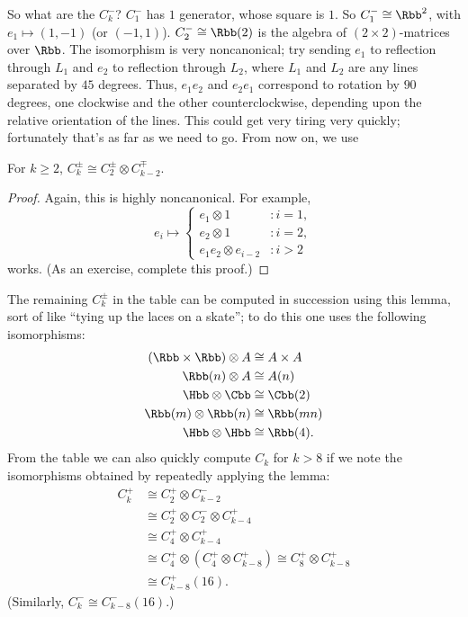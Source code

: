 So what are the $C_k^-$?  $C_1^-$ has $1$ generator, whose square is $1$.  So $C_1^- \cong \Rbb^2$, with $e_1 \mapsto (1, -1)$ (or $(-1, 1)$).  $C_2^- \cong \Rbb(2)$ is the algebra of $(2 \times 2)$-matrices over $\Rbb$.  The isomorphism is very noncanonical; try sending %
$e_1$ to reflection through $L_1$ and $e_2$ to reflection through $L_2$, where $L_1$ and $L_2$ are any lines separated by $45$ degrees.  Thus, $e_1e_2$ and $e_2e_1$ correspond to rotation by $90$ degrees, one clockwise and the other counterclockwise, depending upon the relative orientation of the lines.  This could get very tiring very quickly; fortunately that's as far as we need to go.  From now on, we use
\begin{lem}
For $k \ge 2$, $C_k^\pm \cong C_2^\pm \otimes C_{k-2}^\mp$.
\end{lem}
\begin{proof}
Again, this is highly noncanonical.  For example,
\[
e_i \mapsto
\begin{cases}
e_1 \otimes 1 & : i = 1, \\
e_2 \otimes 1 & : i = 2, \\
e_1e_2 \otimes e_{i-2} &: i > 2
\end{cases}
\]
works.  (As an exercise, complete this proof.) %
\end{proof}

The remaining $C_k^\pm$ in the table can be computed in succession using this lemma, sort of like ``tying up the laces on a skate''; to do this one uses the following isomorphisms:
\begin{align*}
(\Rbb \times \Rbb) \otimes A & \cong A \times A \\
\Rbb(n) \otimes A & \cong A(n) \\
\Hbb \otimes \Cbb & \cong \Cbb(2) \\
\Rbb(m) \otimes \Rbb(n) & \cong \Rbb(mn) \\
\Hbb \otimes \Hbb & \cong \Rbb(4).
\end{align*}
From the table we can also quickly compute $C_k$ for $k > 8$ if we note the isomorphisms obtained by repeatedly applying the lemma:
\begin{align*}
C_k^+ & \cong C_2^+ \otimes C_{k-2}^- \\
& \cong C_2^+ \otimes C_2^- \otimes C^+_{k-4} \\
& \cong C_4^+ \otimes C_{k-4}^+ \\
& \cong C_4^+ \otimes (C_4^+ \otimes C_{k-8}^+) \cong C_8^+ \otimes C_{k-8}^+ \\
& \cong C_{k-8}^+(16).
\end{align*}
(Similarly, $C_k^- \cong C_{k-8}^-(16)$.)

